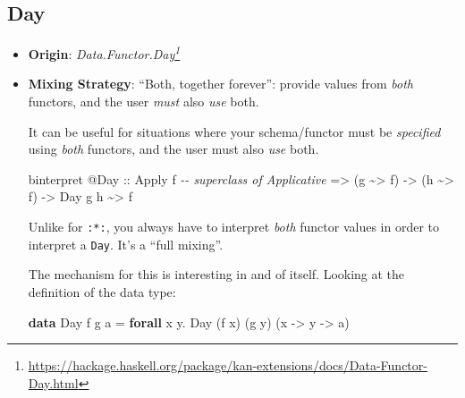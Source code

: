 \documentclass[]{article}
\newenvironment{Shaded}{}{}
\newcommand{\CommentTok}[1]{\textcolor[rgb]{0.38,0.63,0.69}{\textit{#1}}}
\newcommand{\DataTypeTok}[1]{\textcolor[rgb]{0.56,0.13,0.00}{#1}}
\newcommand{\KeywordTok}[1]{\textcolor[rgb]{0.00,0.44,0.13}{\textbf{#1}}}
\newcommand{\NormalTok}[1]{#1}
\newcommand{\OperatorTok}[1]{\textcolor[rgb]{0.40,0.40,0.40}{#1}}
\newcommand{\OtherTok}[1]{\textcolor[rgb]{0.00,0.44,0.13}{#1}}
\renewcommand{\href}[2]{#2\footnote{\url{#1}}}
\begin{document}
\hypertarget{day}{%
\subsection{Day}\label{day}}

\begin{itemize}
\item
  \textbf{Origin}:
  \emph{\href{https://hackage.haskell.org/package/kan-extensions/docs/Data-Functor-Day.html}{Data.Functor.Day}}
\item
  \textbf{Mixing Strategy}: ``Both, together forever'': provide values from
  \emph{both} functors, and the user \emph{must} also \emph{use} both.

  It can be useful for situations where your schema/functor must be
  \emph{specified} using \emph{both} functors, and the user must also \emph{use}
  both.

\begin{Shaded}
\begin{Highlighting}[]
\NormalTok{binterpret }\OperatorTok{@}\DataTypeTok{Day}
\OtherTok{    ::} \DataTypeTok{Apply}\NormalTok{ f          }\CommentTok{{-}{-} superclass of Applicative}
    \OtherTok{=>}\NormalTok{ (g }\OperatorTok{\textasciitilde{}>}\NormalTok{ f)}
    \OtherTok{{-}>}\NormalTok{ (h }\OperatorTok{\textasciitilde{}>}\NormalTok{ f)}
    \OtherTok{{-}>} \DataTypeTok{Day}\NormalTok{ g h }\OperatorTok{\textasciitilde{}>}\NormalTok{ f}
\end{Highlighting}
\end{Shaded}

  Unlike for \texttt{:*:}, you always have to interpret \emph{both} functor
  values in order to interpret a \texttt{Day}. It's a ``full mixing''.

  The mechanism for this is interesting in and of itself. Looking at the
  definition of the data type:

\begin{Shaded}
\begin{Highlighting}[]
\KeywordTok{data} \DataTypeTok{Day}\NormalTok{ f g a }\OtherTok{=} \KeywordTok{forall}\NormalTok{ x y}\OperatorTok{.} \DataTypeTok{Day}\NormalTok{ (f x) (g y) (x }\OtherTok{{-}>}\NormalTok{ y }\OtherTok{{-}>}\NormalTok{ a)}
\end{Highlighting}
\end{Shaded}


\end{itemize}
\end{document}
